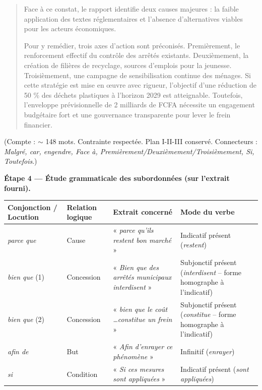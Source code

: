 \documentclass[11pt]{article}
\begin{document}
\begin{exoresolu}
\begin{quote}
Face à ce constat, le rapport identifie deux causes majeures : la faible application des textes réglementaires et l'absence d'alternatives viables pour les acteurs économiques.

Pour y remédier, trois axes d'action sont préconisés. Premièrement, le renforcement effectif du contrôle des arrêtés existants. Deuxièmement, la création de filières de recyclage, sources d'emplois pour la jeunesse. Troisièmement, une campagne de sensibilisation continue des ménages. Si cette stratégie est mise en œuvre avec rigueur, l'objectif d'une réduction de 50 \% des déchets plastiques à l'horizon 2029 est atteignable. Toutefois, l'enveloppe prévisionnelle de 2 milliards de FCFA nécessite un engagement budgétaire fort et une gouvernance transparente pour lever le frein financier.
\end{quote}
(Compte : $\sim$ 148 mots. Contrainte respectée. Plan I-II-III conservé. Connecteurs : \emph{Malgré, car, engendre, Face à, Premièrement/Deuxièmement/Troisièmement, Si, Toutefois}.)

\textbf{Étape 4 — Étude grammaticale des subordonnées (sur l'extrait fourni).}

\begin{center}
\begin{tabularx}{\linewidth}{|l|X|X|X|}\hline
\rowcolor{popblueL} \textbf{Conjonction / Locution} & \textbf{Relation logique} & \textbf{Extrait concerné} & \textbf{Mode du verbe} \\ \hline
\emph{parce que} & Cause & « \emph{parce qu'ils restent bon marché} » & Indicatif présent (\emph{restent}) \\ \hline
\emph{bien que} (1) & Concession & « \emph{Bien que des arrêtés municipaux interdisent} » & Subjonctif présent (\emph{interdisent} -- forme homographe à l'indicatif) \\ \hline
\emph{bien que} (2) & Concession & « \emph{bien que le coût \dots constitue un frein} » & Subjonctif présent (\emph{constitue} -- forme homographe à l'indicatif) \\ \hline
\emph{afin de} & But & « \emph{Afin d'enrayer ce phénomène} » & Infinitif (\emph{enrayer}) \\ \hline
\emph{si} & Condition & « \emph{Si ces mesures sont appliquées} » & Indicatif présent (\emph{sont appliquées}) \\ \hline
\end{tabularx}
\end{center}


\end{exoresolu}
\end{document}
